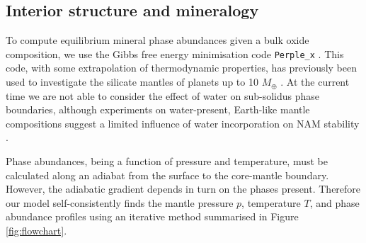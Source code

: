 \documentclass[fleqn,usenatbib]{mnras}
\begin{document}
\subsection{Interior structure and mineralogy}\label{sec:methods_structure}


To compute equilibrium mineral phase abundances given a bulk oxide composition, we use the Gibbs free energy minimisation code {\tt Perple\_x} \citep{connolly_geodynamic_2009}. This code, with some extrapolation of thermodynamic properties, has previously been used to investigate the silicate mantles of planets up to 10 $M_\oplus$ \citep{dorn_can_2015, dorn_generalized_2017, dorn_new_2019, unterborn_inward_2018, hinkel_starplanet_2018, unterborn_pressure_2019, otegi_impact_2020, wang_detailed_2022}. At the current time we are not able to consider the effect of water on sub-solidus phase boundaries, although experiments on water-present, Earth-like mantle compositions suggest a limited influence of water incorporation on NAM stability \citep[shifting the depth of phase boundaries by at most a few GPa;][]{litasov_influence_2006}.

Phase abundances, being a function of pressure and temperature, must be calculated along an adiabat from the surface to the core-mantle boundary. However, the adiabatic gradient depends in turn on the phases present. Therefore our model self-consistently finds the mantle pressure $p$, temperature $T$, and phase abundance profiles using an iterative method summarised in Figure \ref{fig:flowchart}. 
\end{document}
